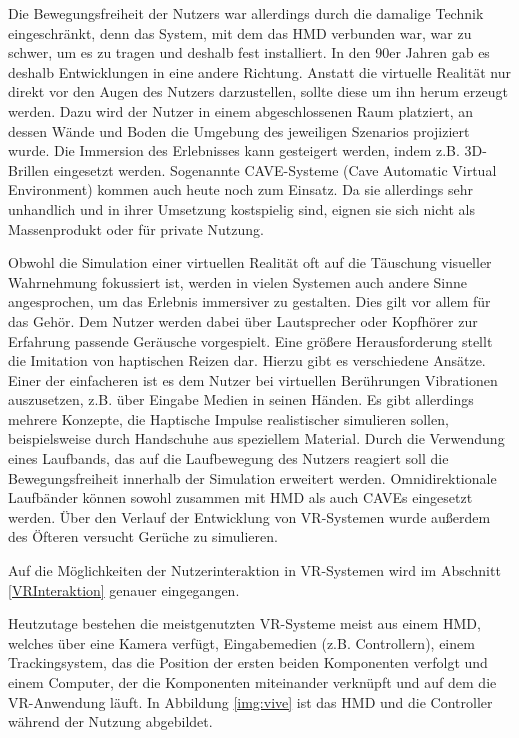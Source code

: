 Die Bewegungsfreiheit der Nutzers war allerdings durch die damalige Technik eingeschränkt, denn das System, mit dem das HMD verbunden war, war zu schwer, um es zu tragen und deshalb fest installiert. 
In den 90er Jahren gab es deshalb Entwicklungen in eine andere Richtung. Anstatt die virtuelle Realität nur direkt vor den Augen des Nutzers darzustellen, sollte diese um ihn herum erzeugt werden. Dazu wird der Nutzer in einem abgeschlossenen Raum platziert, an dessen Wände und Boden die Umgebung des jeweiligen Szenarios projiziert wurde. Die Immersion des Erlebnisses kann gesteigert werden, indem z.B. 3D-Brillen eingesetzt werden. Sogenannte CAVE-Systeme (Cave Automatic Virtual Environment) kommen auch heute noch zum Einsatz. Da sie allerdings sehr unhandlich und in ihrer Umsetzung kostspielig sind, eignen sie sich nicht als Massenprodukt oder für private Nutzung.

Obwohl die Simulation einer virtuellen Realität oft auf die Täuschung visueller Wahrnehmung fokussiert ist, werden in vielen Systemen auch andere Sinne angesprochen, um das Erlebnis immersiver zu gestalten. Dies gilt vor allem für das Gehör. Dem Nutzer werden dabei über Lautsprecher oder Kopfhörer zur Erfahrung passende Geräusche vorgespielt.
Eine größere Herausforderung stellt die Imitation von haptischen Reizen dar. Hierzu gibt es verschiedene Ansätze. Einer der einfacheren ist es dem Nutzer bei virtuellen Berührungen Vibrationen auszusetzen, z.B. über Eingabe Medien in seinen Händen. Es gibt allerdings mehrere Konzepte, die Haptische Impulse realistischer simulieren sollen, beispielsweise durch Handschuhe aus speziellem Material. %
Durch die Verwendung eines Laufbands, das auf die Laufbewegung des Nutzers reagiert soll die Bewegungsfreiheit innerhalb der Simulation erweitert werden. Omnidirektionale Laufbänder können sowohl zusammen mit HMD als auch CAVEs eingesetzt werden.
Über den Verlauf der Entwicklung von VR-Systemen wurde außerdem des Öfteren versucht Gerüche zu simulieren. %

Auf die Möglichkeiten der Nutzerinteraktion in VR-Systemen wird im Abschnitt \ref{VRInteraktion} genauer eingegangen.

Heutzutage bestehen die meistgenutzten VR-Systeme meist aus einem HMD, welches über eine Kamera verfügt, Eingabemedien (z.B. Controllern), einem Trackingsystem, das die Position der ersten beiden Komponenten verfolgt und einem Computer, der die Komponenten miteinander verknüpft und auf dem die VR-Anwendung läuft. 
In Abbildung \ref{img:vive} ist das HMD und die Controller während der Nutzung abgebildet.

